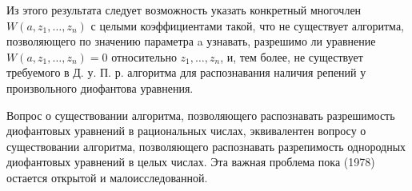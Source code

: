 \documentclass[10pt]{article}
\begin{document}
Из этого результата следует возможность указать конкретный многочлен $W\left(a, z_{1}, \ldots, z_{n}\right)$ с целыми коэффициентами такой, что не существует алгоритма, позволяющего по значению параметра a узнавать, разрешимо ли уравнение $W\left(a, z_{1}, \ldots, z_{n}\right)=0$ относительно $z_{1}, \ldots, z_{n}$, и, тем более, не существует требуемого в Д. у. П. р. алгоритма для распознавания наличия репений у произвольного диофантова уравнения.



Вопрос о существовании алгоритма, позволяющего распознавать разрешимость диофантовых уравнений в рациональных числах, эквивалентен вопросу о существовании алгоритма, позволяющего распознавать разрепимость однородных диофантовых уравнений в целых числах. Эта важная проблема пока (1978) остается открытой и малоисследованной.
\end{document}
